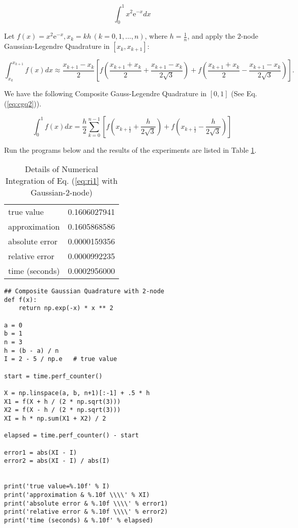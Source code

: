 \documentclass[preprint,12pt]{elsarticle}
\begin{document}
\begin{equation}
\label{eq:cgq1}
    \int_{0}^{1}x^{2}\mathrm{e}^{-x} dx
\end{equation}

Let $f(x)=x^{2}\mathrm{e}^{-x},x_{k}=kh\,(k=0,1,\dots,n)$, where $h=\frac{1}{n}$, and apply the $2$-node Gaussian-Legendre Quadrature in $[x_{k},x_{k+1}]$:

\begin{dmath}
    \int_{x_k}^{x_{k+1}} f(x) dx \approx \frac{x_{k+1}-x_{k}}{2}\left[f\left(\frac{x_{k+1}+x_{k}}{2} + \frac{x_{k+1}-x_{k}}{2\sqrt3}\right) + f\left(\frac{x_{k+1}+x_{k}}{2} - \frac{x_{k+1}-x_{k}}{2\sqrt3}\right)\right].
\end{dmath}

We have the following Composite Gauss-Legendre Quadrature in $[0,1]$ (See Eq. (\ref{eq:cgq2})).

\begin{equation}
\label{eq:cgq2}
    \int_{0}^{1}f(x) dx = \frac{h}{2}\sum_{k=0}^{n-1}\left[f\left(x_{k+\frac{1}{2}}+\frac{h}{2\sqrt 3}\right)+f\left(x_{k+\frac{1}{2}}-\frac{h}{2\sqrt 3}\right)\right]
\end{equation}

Run the programs below and the results of the experiments are listed in Table \ref{tab:cgq1}.

\begin{table}[h]
\centering
\begin{tabular}{l|l}
\hline
true value & 0.1606027941 \\
approximation & 0.1605868586 \\
absolute error & 0.0000159356 \\
relative error & 0.0000992235 \\
time (seconds) & 0.0002956000
\end{tabular}
\caption{Details of Numerical Integration of Eq. (\ref{eq:ri1} with Gaussian-2-node)}
\label{tab:cgq1}
\end{table}

\begin{lstlisting}
## Composite Gaussian Quadrature with 2-node
def f(x):
    return np.exp(-x) * x ** 2

a = 0
b = 1
n = 3
h = (b - a) / n
I = 2 - 5 / np.e   # true value

start = time.perf_counter()

X = np.linspace(a, b, n+1)[:-1] + .5 * h
X1 = f(X + h / (2 * np.sqrt(3)))
X2 = f(X - h / (2 * np.sqrt(3)))
XI = h * np.sum(X1 + X2) / 2

elapsed = time.perf_counter() - start

error1 = abs(XI - I)
error2 = abs(XI - I) / abs(I)


print('true value=%.10f' % I)
print('approximation & %.10f \\\\' % XI)
print('absolute error & %.10f \\\\' % error1)
print('relative error & %.10f \\\\' % error2)
print('time (seconds) & %.10f' % elapsed)
\end{lstlisting}
\end{document}
